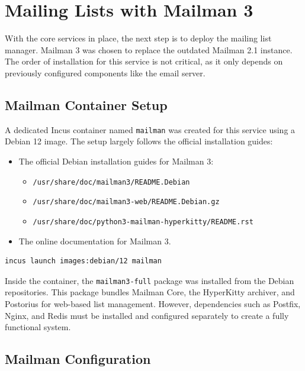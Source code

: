\section{Mailing Lists with Mailman 3}
\label{sec:mailman}

With the core services in place, the next step is to deploy the mailing list manager. Mailman 3 was chosen to replace the outdated Mailman 2.1 instance. The order of installation for this service is not critical, as it only depends on previously configured components like the email server.

\subsection*{Mailman Container Setup}

A dedicated Incus container named \texttt{mailman} was created for this service using a Debian 12 image. The setup largely follows the official installation guides:
\begin{itemize}
    \item The official Debian installation guides for Mailman 3:
    \begin{itemize}
        \item \texttt{/usr/share/doc/mailman3/README.Debian}
        \item \texttt{/usr/share/doc/mailman3-web/README.Debian.gz}
        \item \texttt{/usr/share/doc/python3-mailman-hyperkitty/README.rst}
    \end{itemize}
    \item The online documentation for Mailman 3\cite{mailman3-docs}.
\end{itemize}

\begin{lstlisting}[language=bash,caption={Creating the Mailman container.}]
incus launch images:debian/12 mailman
\end{lstlisting}

Inside the container, the \texttt{mailman3-full} package was installed from the Debian repositories. This package bundles Mailman Core, the HyperKitty archiver, and Postorius for web-based list management. However, dependencies such as Postfix, Nginx, and Redis must be installed and configured separately to create a fully functional system.

\subsection*{Mailman Configuration}

